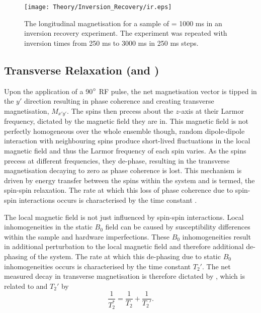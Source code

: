 \begin{figure}[H]
	\centering
	\texttt{[image: Theory/Inversion\_Recovery/ir.eps]}
	\caption{The longitudinal magnetisation for a sample of \tone = 1000 ms in an inversion recovery experiment. The experiment was repeated with inversion times from 250 ms to 3000 ms in 250 ms steps.}
	\label{fig:theory_inversion_recovery}	
\end{figure}
\subsection{Transverse Relaxation (\ttwo and \ttwostar)}
\label{subsec:theory_t2}
Upon the application of a 90$\degree$ \ac{RF} pulse, the net magnetisation vector is tipped in the $y'$ direction resulting in phase coherence and creating transverse magnetisation, $M_{x'y'}$. The spins then precess about the $z$-axis at their Larmor frequency, dictated by the magnetic field they are in. This magnetic field is not perfectly homogeneous over the whole ensemble though, random dipole-dipole interaction with neighbouring spins produce short-lived fluctuations in the local magnetic field and thus the Larmor frequency of each spin varies. As the spins precess at different frequencies, they de-phase, resulting in the transverse magnetisation decaying to zero as phase coherence is lost. This mechanism is driven by energy transfer between the spins within the system and is termed, the spin-spin relaxation. The rate at which this loss of phase coherence due to spin-spin interactions occurs is characterised by the time constant \ttwo.

\newpage
The local magnetic field is not just influenced by spin-spin interactions. Local inhomogeneities in the static $B_0$ field can be caused by susceptibility differences within the sample and hardware imperfections. These $B_0$  inhomogeneities result in additional perturbation to the local magnetic field and therefore additional de-phasing of the system. The rate at which this de-phasing due to static $B_0$ inhomogeneities occurs is characterised by the time constant $T_2'$. The net measured decay in transverse magnetisation is therefore dictated by \ttwostar, which is related to \ttwo and $T_2'$ by
\begin{equation}
\frac{1}{T_2^*} = \frac{1}{T_2} + \frac{1}{T_2'}.
\end{equation}
